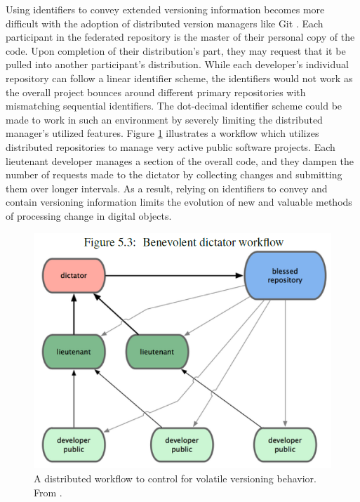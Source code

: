 Using identifiers to convey extended versioning information becomes more difficult with the adoption of distributed version managers like Git \cite{cederqvist2002version}.
Each participant in the federated repository is the master of their personal copy of the code.
Upon completion of their distribution's part, they may request that it be pulled into another participant's distribution.
While each developer's individual repository can follow a linear identifier scheme, the identifiers would not work as the overall project bounces around different primary repositories with mismatching sequential identifiers.
The dot-decimal identifier scheme could be made to work in such an environment by severely limiting the distributed manager's utilized features.
Figure \ref{fig:federated} illustrates a workflow which utilizes distributed repositories to manage very active public software projects.
Each lieutenant developer manages a section of the overall code, and they dampen the number of requests made to the dictator by collecting changes and submitting them over longer intervals.
As a result, relying on identifiers to convey and contain versioning information limits the evolution of new and valuable methods of processing change in digital objects.

\begin{figure}
	\centering
	\includegraphics[scale=0.85]{figures/federatedGit.png}
	\caption[A distributed workflow to control for volatile versioning behavior.]{A distributed workflow to control for volatile versioning behavior.  From  \cite{cederqvist2002version}.}
	\label{fig:federated}
\end{figure}

